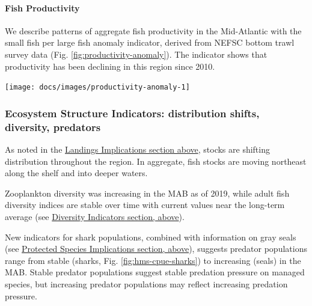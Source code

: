 \documentclass[
  10pt,
]{article}
\let\origfigure\figure
\let\endorigfigure\endfigure
\renewenvironment{figure}[1][2] {
    \expandafter\origfigure\expandafter[H]
} {
    \endorigfigure
}
\begin{document}
\hypertarget{fish-productivity}{%
\paragraph{Fish Productivity}\label{fish-productivity}}

We describe patterns of aggregate fish productivity in the Mid-Atlantic
with the small fish per large fish anomaly indicator, derived from NEFSC
bottom trawl survey data (Fig. \ref{fig:productivity-anomaly}). The
indicator shows that productivity has been declining in this region
since 2010.

\begin{figure}

{\centering \texttt{[image: docs/images/productivity-anomaly-1]} 

}

\caption{Small fish per large fish biomass anomaly in the Mid-Atlantic Bight. The summed anomaly across species is shown by the black line.}\label{fig:productivity-anomaly}
\end{figure}

\hypertarget{ecosystem-structure-indicators-distribution-shifts-diversity-predators}{%
\subsubsection{Ecosystem Structure Indicators: distribution shifts,
diversity,
predators}\label{ecosystem-structure-indicators-distribution-shifts-diversity-predators}}

As noted in the \protect\hyperlink{implications}{Landings Implications
section above}, stocks are shifting distribution throughout the region.
In aggregate, fish stocks are moving northeast along the shelf and into
deeper waters.

Zooplankton diversity was increasing in the MAB as of 2019, while adult
fish diversity indices are stable over time with current values near the
long-term average (see
\protect\hyperlink{ecological-diversity}{Diversity Indicators section,
above}).

New indicators for shark populations, combined with information on gray
seals (see \protect\hyperlink{protected-species}{Protected Species
Implications section, above}), suggests predator populations range from
stable (sharks, Fig. \ref{fig:hms-cpue-sharks}) to increasing (seals) in
the MAB. Stable predator populations suggest stable predation pressure
on managed species, but increasing predator populations may reflect
increasing predation pressure.
\end{document}
